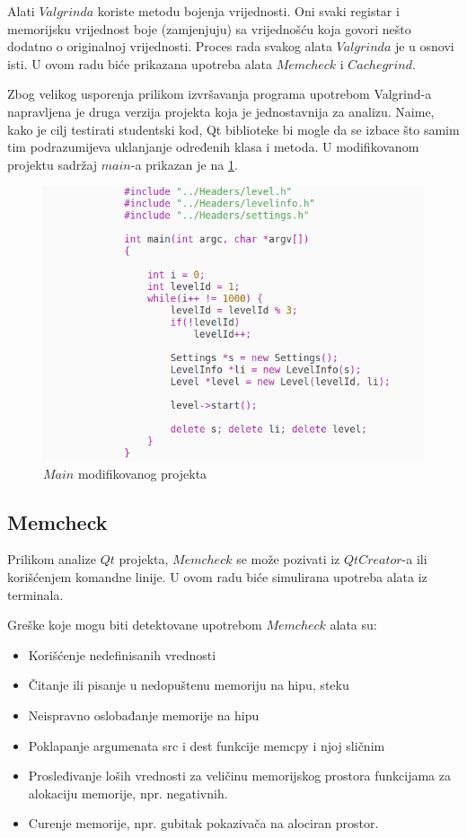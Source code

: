 \documentclass[a4paper]{article}
\begin{document}
Alati $Valgrinda$ koriste metodu bojenja vrijednosti. Oni svaki registar i memorijsku vrijednost boje (zamjenjuju) sa vrijednošću koja govori nešto dodatno o originalnoj vrijednosti. Proces rada svakog alata $Valgrinda$ je u osnovi isti. U ovom radu biće prikazana upotreba alata $Memcheck$ i $Cachegrind$. \cite{verifikacija2}

Zbog velikog usporenja prilikom izvršavanja programa upotrebom Valgrind-a napravljena je druga verzija projekta koja je jednostavnija za analizu. Naime, kako je cilj testirati studentski kod, Qt biblioteke bi mogle da se izbace što samim tim podrazumijeva uklanjanje određenih klasa i metoda. U modifikovanom projektu sadržaj $main$-a prikazan je na \ref{fig:main}.

	\begin{figure}[h!]
		\centering
		\caption{$Main$ modifikovanog projekta}
		\label{fig:main}
		\includegraphics[scale=0.5]{main1.png}
	\end{figure}

	\subsection{Memcheck}
	Prilikom analize $Qt$ projekta, $Memcheck$ se može pozivati iz $QtCreator$-a ili korišćenjem komandne linije. U ovom radu biće simulirana upotreba alata iz terminala. 
	
Greške koje mogu biti detektovane upotrebom $Memcheck$ alata su:
\begin{itemize}
	\item Korišćenje nedefinisanih vrednosti
	\item Čitanje ili pisanje u nedopuštenu memoriju na hipu, steku
	\item Neispravno oslobađanje memorije na hipu
	\item Poklapanje argumenata src i dest funkcije memcpy i njoj sličnim
	\item Prosleđivanje loših vrednosti za veličinu memorijskog prostora funkcijama za alokaciju memorije, npr. negativnih.
	\item Curenje memorije, npr. gubitak pokazivača na alociran prostor.
\end{itemize}
\end{document}
